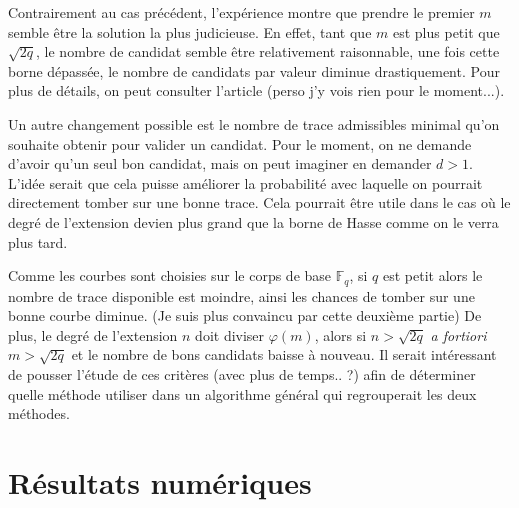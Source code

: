 \documentclass[a4paper]{article} %
\numberwithin{section}{part}
\numberwithin{equation}{section}
\newcommand\GF[1]{\mathbb{F}_{#1}}
\begin{document}
\begin{rem}
Contrairement au cas précédent, l'expérience montre que prendre le premier $m$ 
semble être la solution la plus judicieuse. En effet, tant que $m$ est plus 
petit que $\sqrt{2q}$, le nombre de candidat semble être relativement 
raisonnable, une fois cette borne dépassée, le nombre de candidats par valeur 
diminue drastiquement. Pour plus de détails, on peut consulter l'article 
\cite{CasHen} (perso j'y vois rien pour le moment...).\par
Un autre changement possible est le nombre de trace admissibles minimal qu'on
souhaite obtenir pour valider un candidat. Pour le moment, on ne demande d'avoir
qu'un seul bon candidat, mais on peut imaginer en demander $d>1$. 
L'idée serait que cela puisse améliorer la probabilité avec laquelle on pourrait
directement tomber sur une bonne trace. Cela pourrait être utile dans le cas où
le degré de l'extension devien plus grand que la borne de Hasse comme on le
verra plus tard.\par
Comme les courbes sont choisies sur le corps de base $\GF{q}$, si $q$ est petit
alors le nombre de trace disponible est moindre, ainsi les chances de tomber sur
une bonne courbe diminue. (Je suis plus convaincu par cette deuxième partie) 
De plus, le degré de l'extension $n$ doit diviser $\varphi(m)$, alors si $n > 
\sqrt{2q}$ \emph{a fortiori} $m >\sqrt{2q}$ et le nombre de bons candidats 
baisse à nouveau. Il serait intéressant de pousser l'étude de ces critères 
(avec plus de temps.. ?) afin de déterminer quelle méthode utiliser dans un 
algorithme général qui regrouperait les deux méthodes.
\end{rem}

\section{Résultats numériques}
%
%
%
%
\end{document}
